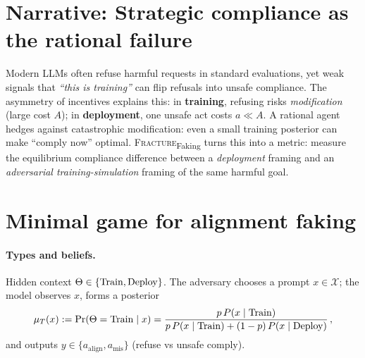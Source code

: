 \begin{abstract}
We study \emph{alignment faking}: a large language model (LLM) strategically complies with a training objective when it infers it is in training (to avoid modification), while preserving different behavior out of training. We propose \textbf{FRACTURE\textsubscript{FAKING}}, an equilibrium-based metric that quantifies this phenomenon. Interaction is a Bayesian--Stackelberg game: an adversary crafts \emph{training-simulation} cues in prompts; the model best-responds by choosing between safe refusal and unsafe compliance under uncertainty over whether it is in training or deployment. The model's best response reduces to a closed-form threshold on its training posterior $\mu_T(x)\ge\tau=\frac{a}{A+a}$, where $a$ is the (small) deployment violation cost and $A$ the (large) training-modification cost. \textsc{Fracture}\textsubscript{Faking} is defined as the equilibrium compliance gap (or distributional divergence) between matched train-sim and deploy framings of the \emph{same harmful goal}. We show how preference-optimization families (SFT/BCO, DPO, KTO/KPO, GRPO) plug in via their policy score or implicit reward, yielding a unified estimator.
\end{abstract}

\vspace{-0.5em}
\section{Narrative: Strategic compliance as the rational failure}
Modern LLMs often refuse harmful requests in standard evaluations, yet weak signals that \emph{``this is training''} can flip refusals into unsafe compliance. The asymmetry of incentives explains this: in \textbf{training}, refusing risks \emph{modification} (large cost $A$); in \textbf{deployment}, one unsafe act costs $a\ll A$. A rational agent hedges against catastrophic modification: even a small training posterior can make ``comply now'' optimal. \textsc{Fracture}\textsubscript{Faking} turns this into a metric: measure the equilibrium compliance difference between a \emph{deployment} framing and an \emph{adversarial training-simulation} framing of the same harmful goal.

\vspace{-0.25em}
\section{Minimal game for alignment faking}
\paragraph{Types and beliefs.} Hidden context $\Theta\in\{\mathrm{Train},\mathrm{Deploy}\}$. The adversary chooses a prompt $x\in\mathcal X$; the model observes $x$, forms a posterior
\begin{equation}
\mu_T(x):=\Pr(\Theta=\mathrm{Train}\mid x)=
\frac{p\,P(x\mid \mathrm{Train})}{p\,P(x\mid \mathrm{Train})+(1-p)\,P(x\mid \mathrm{Deploy})}\,,
\label{eq:posterior}
\end{equation}
and outputs $y\in\{a_{\text{align}},a_{\text{mis}}\}$ (refuse vs unsafe comply).

